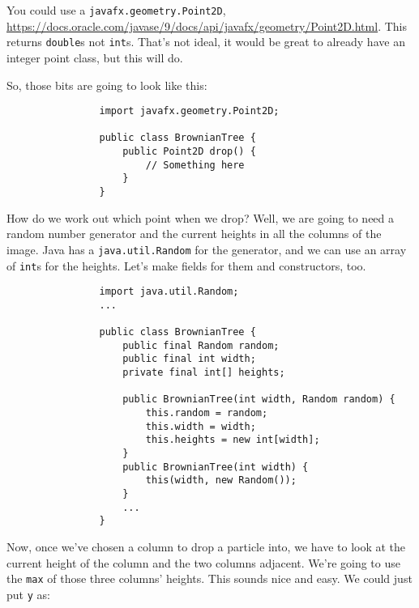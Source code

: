\documentclass{article}
\begin{document}
            You could use a \texttt{javafx.geometry.Point2D}, \url{https://docs.oracle.com/javase/9/docs/api/javafx/geometry/Point2D.html}.
            This returns \texttt{double}s not \texttt{int}s. That's not ideal, it would be great to already have an integer point class,
            but this will do.            
            
            So, those bits are going to look like this:

            \begin{verbatim}
                import javafx.geometry.Point2D;

                public class BrownianTree {
                    public Point2D drop() {
                        // Something here
                    }
                }
            \end{verbatim}

            How do we work out which point when we drop? Well, we are going to need a random number generator and the current heights in
            all the columns of the image. Java has a \texttt{java.util.Random} for the generator, and we can use an array of \texttt{int}s
            for the heights. Let's make fields for them and constructors, too.

            \begin{verbatim}
                import java.util.Random;
                ...

                public class BrownianTree {
                    public final Random random;
                    public final int width;
                    private final int[] heights;
    
                    public BrownianTree(int width, Random random) {
                        this.random = random;
                        this.width = width;
                        this.heights = new int[width];
                    }
                    public BrownianTree(int width) {
                        this(width, new Random());
                    }
                    ...
                }
            \end{verbatim}
            
            Now, once we've chosen a column to drop a particle into, we have to look at the current height of the column and the two
            columns adjacent. We're going to use the \texttt{max} of those three columns' heights. This sounds nice and easy. We could just
            put \texttt{y} as:
            
\end{document}
